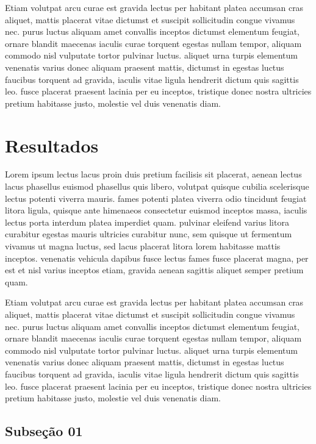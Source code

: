 \documentclass[journal,article,submit,moreauthors,pdftex,10pt,a4paper]{mdpi}
\begin{document}
Etiam volutpat arcu curae est gravida lectus per habitant platea accumsan cras aliquet, mattis placerat vitae dictumst et suscipit sollicitudin congue vivamus nec. purus luctus aliquam amet convallis inceptos dictumst elementum feugiat, ornare blandit maecenas iaculis curae torquent egestas nullam tempor, aliquam commodo nisl vulputate tortor pulvinar luctus. aliquet urna turpis elementum venenatis varius donec aliquam praesent mattis, dictumst in egestas luctus faucibus torquent ad gravida, iaculis vitae ligula hendrerit dictum quis sagittis leo. fusce placerat praesent lacinia per eu inceptos, tristique donec nostra ultricies pretium habitasse justo, molestie vel duis venenatis diam. 

\section{Resultados}

Lorem ipsum lectus lacus proin duis pretium facilisis sit placerat, aenean lectus lacus phasellus euismod phasellus quis libero, volutpat quisque cubilia scelerisque lectus potenti viverra mauris. fames potenti platea viverra odio tincidunt feugiat litora ligula, quisque ante himenaeos consectetur euismod inceptos massa, iaculis lectus porta interdum platea imperdiet quam. pulvinar eleifend varius litora curabitur egestas mauris ultricies curabitur nunc, sem quisque ut fermentum vivamus ut magna luctus, sed lacus placerat litora lorem habitasse mattis inceptos. venenatis vehicula dapibus fusce lectus fames fusce placerat magna, per est et nisl varius inceptos etiam, gravida aenean sagittis aliquet semper pretium quam. 

Etiam volutpat arcu curae est gravida lectus per habitant platea accumsan cras aliquet, mattis placerat vitae dictumst et suscipit sollicitudin congue vivamus nec. purus luctus aliquam amet convallis inceptos dictumst elementum feugiat, ornare blandit maecenas iaculis curae torquent egestas nullam tempor, aliquam commodo nisl vulputate tortor pulvinar luctus. aliquet urna turpis elementum venenatis varius donec aliquam praesent mattis, dictumst in egestas luctus faucibus torquent ad gravida, iaculis vitae ligula hendrerit dictum quis sagittis leo. fusce placerat praesent lacinia per eu inceptos, tristique donec nostra ultricies pretium habitasse justo, molestie vel duis venenatis diam. 

\subsection{Subseção 01}
\end{document}
